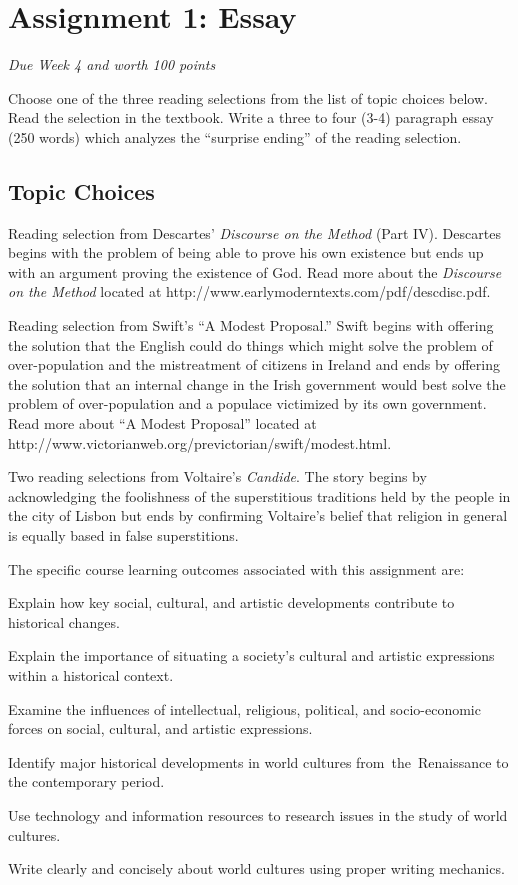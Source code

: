 \pagebreak
\section*{Assignment 1: Essay}
\emph{Due Week 4 and worth 100 points}

Choose one of the three reading selections from the list of topic choices below. Read the selection in the textbook. Write a three to four (3-4) paragraph essay (250 words) which analyzes the ``surprise ending'' of the reading selection.

\subsection*{Topic Choices}
\begin{enumerate*}
	\item Reading selection from Descartes' \emph{Discourse on the Method} (Part IV). Descartes begins with the problem of being able to prove his own existence but ends up with an argument proving the existence of God. Read more about the \emph{Discourse on the Method} located at http://www.earlymoderntexts.com/pdf/descdisc.pdf. 

	\item Reading selection from Swift's ``A Modest Proposal.'' Swift begins with offering the solution that the English could do things which might solve the problem of over-population and the mistreatment of citizens in Ireland and ends by offering the solution that an internal change in the Irish government would best solve the problem of over-population and a populace victimized by its own government. Read more about ``A Modest Proposal'' located at http://www.victorianweb.org/previctorian/swift/modest.html.

	\item Two reading selections from Voltaire's \emph{Candide}. The story begins by acknowledging the foolishness of the superstitious traditions held by the people in the city of Lisbon but ends by confirming Voltaire's belief that religion in general is equally based in false superstitions.
\end{enumerate*}

The specific course learning outcomes associated with this assignment are:
\begin{itemize*}
	\item Explain how key social, cultural, and artistic developments contribute to historical changes.
	\item Explain the importance of situating a society's cultural and artistic expressions within a historical context.
	\item Examine the influences of intellectual, religious, political, and socio-economic forces on social, cultural, and artistic expressions.
	\item Identify major historical developments in world cultures from the Renaissance to the contemporary period.
	\item Use technology and information resources to research issues in the study of world cultures.
	\item Write clearly and concisely about world cultures using proper writing mechanics.
\end{itemize*}

